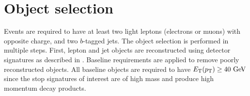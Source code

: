 \begin{table}[ht]
  \caption{
    Stop cross sections and their associated
    uncertainties~\cite{Beenakker:1997ut,Beenakker:2010nq,Beenakker:2011fu}.
  }
  \label{tab:stop_xsec}
\end{table}

\FloatBarrier
\section{Object selection}
\label{sec:object_selection}

Events are required to have at least two light leptons (electrons or muons)
with opposite charge, and two $b$-tagged jets.
The object selection is performed in multiple steps. First, lepton and jet
objects are reconstructed using detector signatures as described in
.
Baseline requirements are applied to remove poorly reconstructed objects.
All baseline objects are required to have $\ET(\pt) \geq 40 \GeV$ since the
stop signatures of interest are of high mass and produce high momentum decay
products.

